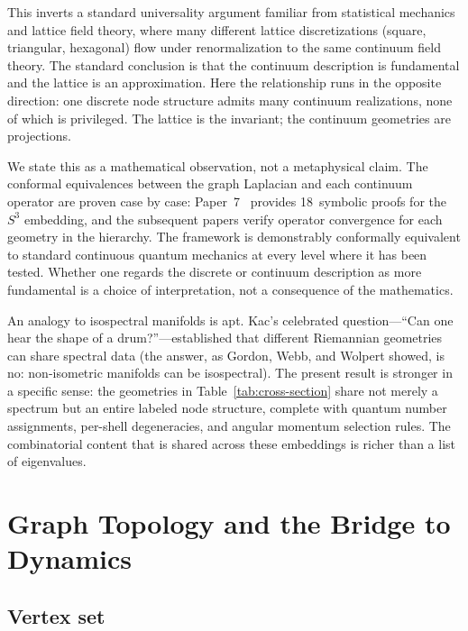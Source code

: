 \documentclass[aps,prl,reprint,amsmath,amssymb]{revtex4-2}
\begin{document}
This inverts a standard universality argument familiar from statistical
mechanics and lattice field theory, where many different lattice
discretizations (square, triangular, hexagonal) flow under
renormalization to the same continuum field theory.  The standard
conclusion is that the continuum description is fundamental and the
lattice is an approximation.  Here the relationship runs in the
opposite direction: one discrete node structure admits many continuum
realizations, none of which is privileged.  The lattice is the
invariant; the continuum geometries are projections.

We state this as a mathematical observation, not a metaphysical claim.
The conformal equivalences between the graph Laplacian and each
continuum operator are proven case by case: Paper~7~\cite{paper7}
provides 18~symbolic proofs for the $S^3$ embedding, and the subsequent
papers verify operator convergence for each geometry in the hierarchy.
The framework is demonstrably conformally equivalent to standard
continuous quantum mechanics at every level where it has been tested.
Whether one regards the discrete or continuum description as more
fundamental is a choice of interpretation, not a consequence of the
mathematics.

An analogy to isospectral manifolds is apt.  Kac's celebrated
question---``Can one hear the shape of a drum?''---established that
different Riemannian geometries can share spectral data (the answer, as
Gordon, Webb, and Wolpert showed, is no: non-isometric manifolds can be
isospectral).  The present result is stronger in a specific sense:
the geometries in Table~\ref{tab:cross-section} share not merely a
spectrum but an entire labeled node structure, complete with quantum
number assignments, per-shell degeneracies, and angular momentum
selection rules.  The combinatorial content that is shared across these
embeddings is richer than a list of eigenvalues.


\section{Graph Topology and the Bridge to Dynamics}
\label{sec:graph}

\subsection{Vertex set}
\end{document}
